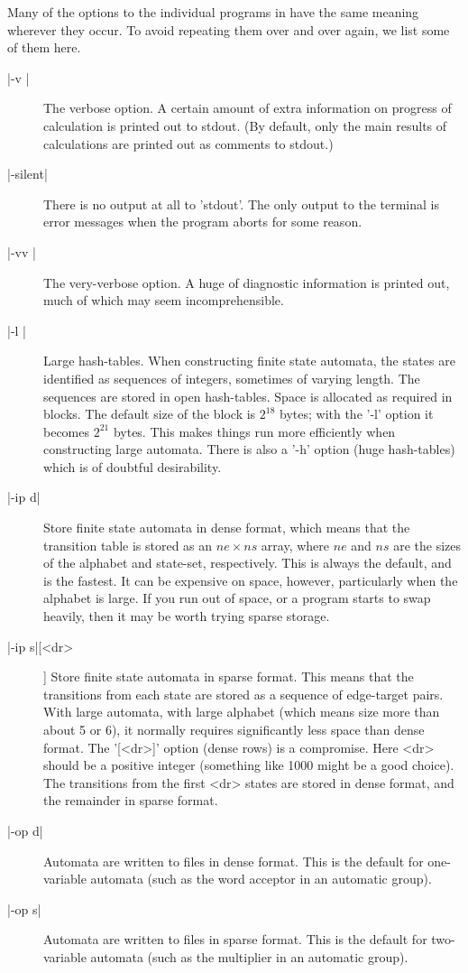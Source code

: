 Many of the options to the individual programs in {\KBMAG} have the same
meaning wherever they occur. To avoid repeating them over and over again, we
list some of them here.
\begin{description}
\item[|-v |]
The verbose option. A certain amount of extra information on progress of
calculation is printed out to stdout.
(By default, only the main results of calculations are printed out as
comments to stdout.)
\item[|-silent|]
There is no output at all to 'stdout'.
The only output to the terminal is error messages when the program
aborts for some reason.
\item[|-vv |]
The very-verbose option. A huge of diagnostic information is printed out,
much of which may seem incomprehensible.
\item[|-l |]
Large hash-tables. When constructing finite state automata, the states
are identified as sequences of integers, sometimes of varying length.
The sequences are stored in open hash-tables. Space is allocated as
required in blocks. The default size of the block is $2^{18}$ bytes;
with the '-l' option it becomes $2^{21}$ bytes. This makes things
run more efficiently when constructing large automata.
There is also a '-h' option (huge hash-tables) which is of doubtful
desirability.
\item[|-ip d|]
Store finite state automata in dense format, which means that the
transition table is stored as an $ne \times ns$ array, where $ne$ and
$ns$ are the sizes of the alphabet  and state-set, respectively.
This is always the default, and is the fastest. It can be expensive on
space, however, particularly when the alphabet is large. If you run out
of space, or a program starts to swap heavily, then it may be worth trying
sparse storage.
\item[|-ip s|[<dr>]]
Store finite state automata in sparse format. This means that the
transitions from each state are stored as a sequence of edge-target
pairs. With large automata, with large alphabet (which means size more
than about 5 or 6), it normally requires significantly less space than
dense format. The '[<dr>]' option (dense rows) is a compromise.
Here <dr> should be a positive integer (something like 1000 might be a good
choice). The transitions from the first <dr> states are stored in dense
format, and the remainder in sparse format.
\item[|-op d|]
Automata are written to files in dense format. This is the default
for one-variable automata (such as the word acceptor in an automatic
group).
\item[|-op s|]
Automata are written to files in sparse format. This is the default
for two-variable automata (such as the multiplier in an automatic
group).
\end{description}

